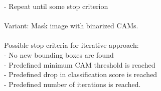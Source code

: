 - Repeat until some stop criterion\\
\\
Variant: Mask image with binarized CAMs.\\
\\
Possible stop criteria for iterative approach:\\
- No new bounding boxes are found\\
- Predefined minimum CAM threshold is reached\\
- Predefined drop in classification score is reached\\
- Predefined number of iterations is reached.\\

